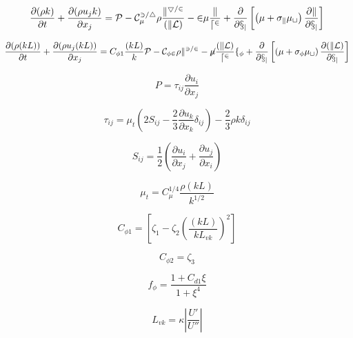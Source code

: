 

\begin{equation}
\frac{\partial (\rho k)}{\partial t} + \frac{\partial (\rho u_j k)}{\partial x_j}
  = \cal P - C_{\mu}^{3/4}\rho \frac{k^{5/2}}{(kL)} - 2 \mu \frac{k}{d^2}  + \frac{\partial}{\partial x_j}
  \left[\left(\mu + \sigma_k \mu_t \right)\frac{\partial k}{\partial x_j}\right]
\end{equation}

\begin{equation}
\frac{\partial (\rho (kL))}{\partial t} + \frac{\partial (\rho u_j (kL))}{\partial x_j}
  = C_{\phi 1}\frac{(kL)}{k} \cal P -
  C_{\phi 2} \rho k^{3/2} - 6 \mu \frac{(kL)}{d^2}f_{\phi} + \frac{\partial}{\partial x_j}
  \left[ \left( \mu + \sigma_{\phi} \mu_t \right)
  \frac{\partial (kL)}{\partial x_j} \right]
\end{equation}

\begin{equation}
P = \tau_{ij} \frac{\partial u_i}{\partial x_j}
\end{equation}

\begin{equation}
\tau_{ij} = \mu_t \left(2S_{ij} - \frac{2}{3} \frac{\partial u_k}{\partial x_k} \delta_{ij} \right)
   - \frac{2}{3} \rho k \delta_{ij}
\end{equation}

\begin{equation}
S_{ij} = \frac{1}{2} \left( \frac{\partial u_i}{\partial x_j} + \frac{\partial u_j}{\partial x_i} \right)
\end{equation}

\begin{equation}
\mu_t = C_{\mu}^{1/4} \frac{\rho (kL)}{k^{1/2}}
\end{equation}

\begin{equation}
C_{\phi 1} = \left[ \zeta_1 - \zeta_2 \left( \frac{(kL)}{k L_{vk}} \right)^2 \right]
\end{equation}

\begin{equation}
C_{\phi 2} = \zeta_3
\end{equation}

\begin{equation}
f_{\phi} = \frac{1+C_{d1} \xi}{1 + \xi^4}
\end{equation}

\begin{equation}
L_{vk} = \kappa \left| \frac{U'}{U''} \right|
\end{equation}

